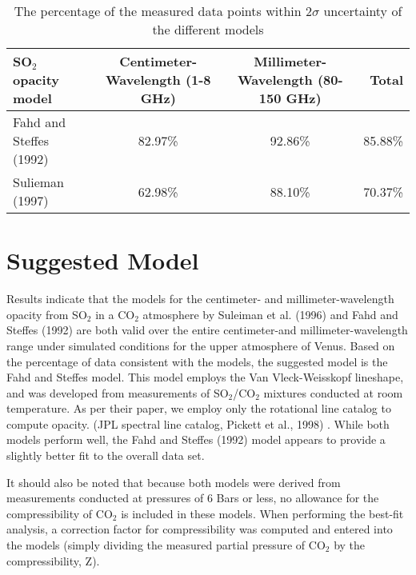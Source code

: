\begin{sidewaystable}[p]

\caption{The percentage of the measured data points within $2\sigma$ uncertainty of the different models}
  \begin{tabular}{l | c c | r}
  \hline
  \hline
  SO$_2$ opacity model & Centimeter-Wavelength (1-8 GHz) & Millimeter-Wavelength (80-150 GHz) &Total\\
  \hline
  Fahd and Steffes (1992)	 & 82.97\%	& 	92.86\%& 85.88\%\\
  Sulieman (1997)& 62.98\%	&	88.10\%&70.37\%\\
  \hline
  \hline
  \end{tabular}
  \label{tab:model-comp}
\end{sidewaystable}

 


\clearpage

\section{Suggested Model}
Results indicate that the models for the centimeter- and millimeter-wavelength opacity from SO$_2$ in a CO$_2$ atmosphere by Suleiman et al. (1996) and Fahd and Steffes (1992) are both valid over the entire centimeter-and millimeter-wavelength range under simulated conditions for the upper atmosphere of Venus. Based on the percentage of data consistent with the models, the suggested model is the Fahd and Steffes \cite{Fahd-thesis} model. This model employs the Van Vleck-Weisskopf lineshape, and was developed from measurements of SO$_2$/CO$_2$ mixtures conducted at room temperature. As per their paper, we employ only the rotational line catalog to compute opacity. (JPL spectral line catalog, Pickett et al., 1998) \cite{Pickett-1998}. While both models perform well, the Fahd and Steffes (1992) model appears to provide a slightly better fit to the overall data set. 

It should also be noted that because both models were derived from measurements conducted at pressures of 6 Bars or less, no allowance for the compressibility of CO$_2$ is included in these models. When performing the best-fit analysis, a correction factor for compressibility was computed and entered into the models (simply dividing the measured partial pressure of CO$_2$ by the compressibility, Z). 

